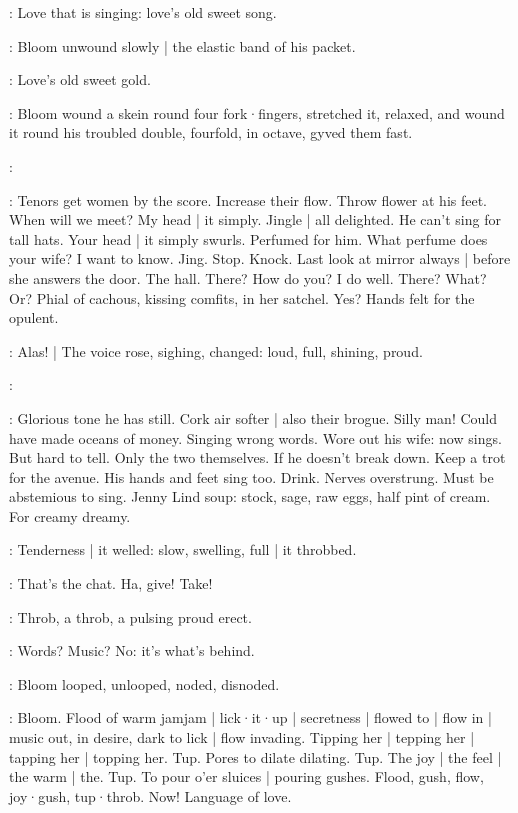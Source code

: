 \BloomInt:
Love that is singing:
love's old sweet song.

:
Bloom unwound slowly |
the elastic band of his packet.

:
Love's old sweet
gold.

:
Bloom wound a skein round four fork·fingers,
stretched it,
relaxed,
and wound it round his troubled double,
fourfold,
in octave,
gyved them fast.

\simon:

\BloomInt:
Tenors get women by the score.
Increase their flow.
Throw flower at his feet.
When will we meet?
My head |
it simply.
Jingle |
all delighted.
He can't sing for tall hats.
Your head |
it simply swurls.
Perfumed for him.
What perfume does your wife?
I want to know.
Jing.
Stop.
Knock.
Last look at mirror always |
before she answers the door.
The hall.
There?
How do you?
I do well.
There?
What?
Or?
Phial of cachous,
kissing comfits,
in her satchel.
Yes?
Hands felt for the opulent.

:
Alas! |
The voice rose,
sighing,
changed:
loud,
full,
shining,
proud.

\simon:

\BloomInt:
Glorious tone he has still.
Cork air softer |
also their brogue.
Silly man!
Could have made oceans of money.
Singing wrong words.
Wore out his wife:
now sings.
But hard to tell.
Only the two themselves.
If he doesn't break down.
Keep a trot for the avenue.
His hands and feet sing too.
Drink.
Nerves overstrung.
Must be abstemious to sing.
Jenny Lind soup:
stock,
sage,
raw eggs,
half pint of cream.
For creamy dreamy.

:
Tenderness |
it welled:
slow,
swelling,
full |
it throbbed.

\BloomInt:
That's the chat.
Ha,
give!
Take!

:
Throb,
a throb,
a pulsing proud erect.

\BloomInt:
Words?
Music?
No:
it's what's behind.

:
Bloom looped,
unlooped,
noded,
disnoded.

\BloomInt:
Bloom.
Flood of warm jamjam |
lick·it·up |
secretness |
flowed to |
flow in |
music out,
in desire,
dark to lick |
flow invading.
Tipping her |
tepping her |
tapping her |
topping her.
Tup.
Pores to dilate dilating.
Tup.
The joy |
the feel |
the warm |
the.
Tup.
To pour o'er sluices |
pouring gushes.
Flood,
gush,
flow,
joy·gush,
tup·throb.
Now!
Language of love.

